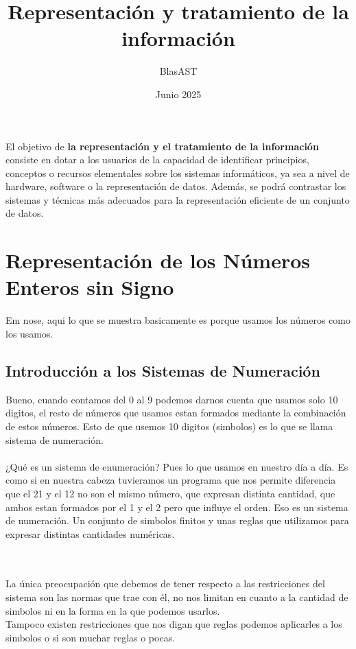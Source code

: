 \documentclass{article}
\title{
    \textbf{Representación y tratamiento de la información}
}
\author{BlasAST}
\date{Junio 2025}
\begin{document}
\maketitle

\newpage

\tableofcontents

\newpage

El objetivo de \textbf{la representación y el tratamiento de la información}
consiste en dotar a los usuarios de la capacidad de identificar principios,
conceptos o recursos elementales sobre los sistemas informáticos, ya sea a
nivel de hardware, software o la representación de datos. Además, se podrá
contrastar los sistemas y técnicas más adecuados para la representación
eficiente de un conjunto de datos.

\newpage

\section{Representación de los Números Enteros sin Signo}
Em nose, aqui lo que se muestra basicamente es porque usamos los
números como los usamos.

\subsection{Introducción a los Sistemas de Numeración}

Bueno, cuando contamos del 0 al 9 podemos darnos cuenta que usamos
solo 10 digitos, el resto de números que usamos estan formados
mediante la combinación de estos números. Esto de que usemos 10 digitos
(simbolos) es lo que se llama sistema de numeración.\\\\¿Qué es un sistema de
enumeración? Pues lo que usamos en nuestro día a día. Es como si en nuestra
cabeza tuvieramos un programa que nos permite diferencia que el 21 y el 12 no
son el mismo número, que expresan distinta cantidad, que ambos estan formados
por el 1 y el 2 pero que influye el orden. Eso es un sistema de numeración.
Un conjunto de simbolos finitos y unas reglas que utilizamos para expresar
distintas cantidades numéricas.\\\\\

La única preocupación que debemos de tener respecto a las restricciones del
sistema son las normas que trae con él, no nos limitan en cuanto a la cantidad
de simbolos ni en la forma en la que podemos usarlos.\\ Tampoco existen
restricciones que nos digan que reglas podemos aplicarles a los simbolos o
si son muchar reglas o pocas.\\\\
\end{document}
